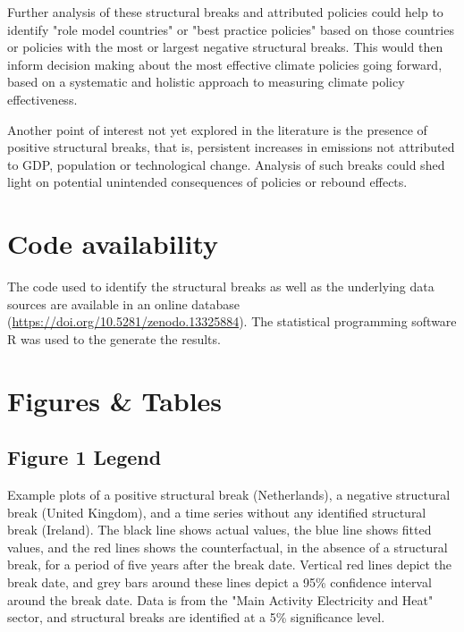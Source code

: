 \documentclass[a4paper]{article}
\begin{document}
Further analysis of these structural breaks and attributed policies could help to identify "role model countries" or "best practice policies" based on those countries or policies with the most or largest negative structural breaks. This would then inform decision making about the most effective climate policies going forward, based on a systematic and holistic approach to measuring climate policy effectiveness.

Another point of interest not yet explored in the literature is the presence of positive structural breaks, that is, persistent increases in emissions not attributed to GDP, population or technological change. Analysis of such breaks could shed light on potential unintended consequences of policies or rebound effects.


\section*{Code availability}

The code used to identify the structural breaks as well as the underlying data sources are available in an online database (\url{https://doi.org/10.5281/zenodo.13325884}). \cite{breaks_database} The statistical programming software R was used to the generate the results.



\newpage

\section*{Figures \& Tables}

\FloatBarrier

\subsection{Figure 1 Legend}
Example plots of a positive structural break (Netherlands), a negative structural break (United Kingdom), and a time series without any identified structural break (Ireland). The black line shows actual values, the blue line shows fitted values, and the red lines shows the counterfactual, in the absence of a structural break, for a period of five years after the break date. Vertical red lines depict the break date, and grey bars around these lines depict a 95\% confidence interval around the break date. Data is from the "Main Activity Electricity and Heat" sector, and structural breaks are identified at a 5\% significance level.
\end{document}
